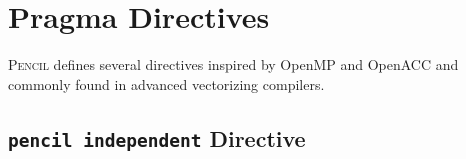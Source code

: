 \documentclass{carp}
\newcommand\pencil{\textsc{Pencil}\xspace}
\begin{document}
%
%
%
%
%
%
%

\section{Pragma Directives}

\pencil defines several directives inspired by OpenMP and OpenACC
and commonly found in advanced vectorizing compilers.

\subsection{\lstinline!pencil independent! Directive}
\end{document}
